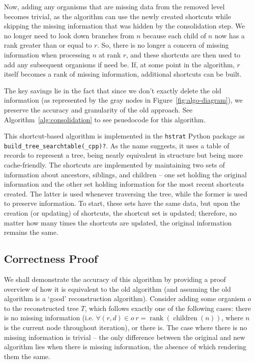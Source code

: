 Now, adding any organisms that are missing data from the removed level becomes trivial, as the algorithm can use the newly created shortcuts while skipping the missing information that was hidden by the consolidation step. We no longer need to look down branches from $n$ because each child of $n$ now has a rank greater than or equal to $r$. So, there is no longer a concern of missing information when processing $n$ at rank $r$, and these shortcuts are then used to add any subsequent organisms if need be. If, at some point in the algorithm, $r$ itself becomes a rank of missing information, additional shortcuts can be built.



The key savings lie in the fact that since we don't exactly delete the old information (as represented by the gray nodes in Figure~\ref{fig:algo-diagram}), we preserve the accuracy and granularity of the old approach. See Algorithm~\ref{alg:consolidation} to see psuedocode for this algorithm.


This shortcut-based algorithm is implemented in the \texttt{hstrat} Python package \citep{moreno2024hstrat} as \texttt{build\_tree\_searchtable(\_cpp)?}. As the name suggests, it uses a table of records to represent a tree, being nearly equivalent in structure but being more cache-friendly. The shortcuts are implemented by maintaining two sets of information about ancestors, siblings, and children -- one set holding the original information and the other set holding information for the most recent shortcuts created. The latter is used whenever traversing the tree, while the former is used to preserve information. To start, these sets have the same data, but upon the creation (or updating) of shortcuts, the shortcut set is updated; therefore, no matter how many times the shortcuts are updated, the original information remains the same. 

\subsection{Correctness Proof}

We shall demonstrate the accuracy of this algorithm by providing a proof overview of how it is equivalent to the old algorithm (and assuming the old algorithm is a `good' reconstruction algorithm). Consider adding some organism $o$ to the reconstructed tree $T$, which follows exactly one of the following cases: there is no missing information (i.e. $\forall (r, d) \in o\ r = \operatorname{rank}(\operatorname{children}(n))$, where $n$ is the current node throughout iteration), or there is. The case where there is no missing information is trivial -- the only difference between the original and new algorithm lies when there is missing information, the absence of which rendering them the same. 

